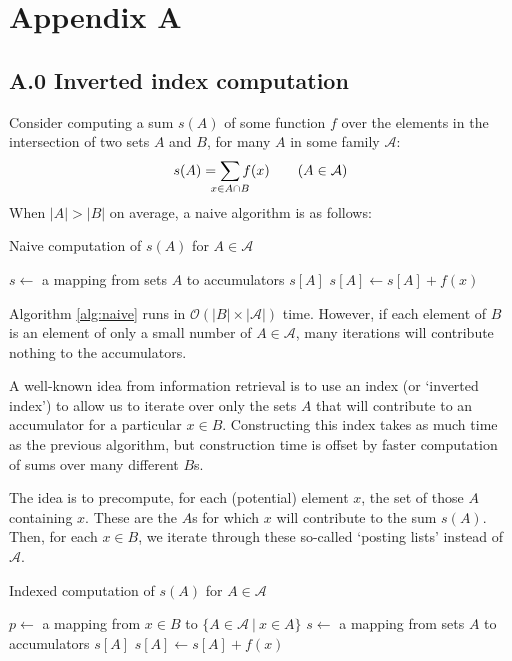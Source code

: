 \documentclass[twocolumn,10pt]{article}
\begin{document}
\section{Appendix A}

\subsection*{A.0 Inverted index computation}

Consider computing a sum $s(A)$ of some function $f$ over the elements
in the intersection of two sets $A$ and $B$, for many $A$ in some
family $\mathcal{A}$:
$$
s(A)
    = \smashoperator{\sum_{x \in A \cap B}} f(x)
\qquad (A \in \mathcal{A})
$$
When $|A| > |B|$ on average, a naive algorithm is as follows:
\begin{algorithm}
\caption{Naive computation of $s(A)$ for $A \in \mathcal{A}$}
\label{alg:naive}
\begin{algorithmic}
    \State $s \gets$ a mapping from sets $A$ to accumulators $s[A]$
                \State $s[A] \gets s[A] + f(x)$
            \EndIf
        \EndFor
    \EndFor
\end{algorithmic}
\end{algorithm}

Algorithm \ref{alg:naive} runs in $\mathcal{O}(|B|\times|\mathcal{A}|)$ time.
However, if each element of $B$ is an element of only a small number
of $A \in\mathcal{A}$, many iterations will contribute nothing to
the accumulators.

A well-known idea from information retrieval is to use an
index (or `inverted index') to allow us to iterate over only
the sets $A$ that will contribute to an accumulator for a particular
$x\in B$. Constructing this index takes as much time as the previous
algorithm, but construction time is offset by faster computation of
sums over many different $B$s.

The idea is to precompute, for each (potential) element $x$, the set
of those $A$ containing $x$. These are the $A$s for which $x$ will
contribute to the sum $s(A)$.
Then, for each $x\in B$, we iterate through these so-called `posting
lists' instead of $\mathcal{A}$.
\begin{algorithm}
\caption{Indexed computation of $s(A)$ for $A \in \mathcal{A}$}
\label{alg:index}
\begin{algorithmic}
    \State $p \gets$ a mapping from $x \in B$ to $\{ A \in \mathcal{A} \ |\  x \in A \}$
    \State $s \gets$ a mapping from sets $A$ to accumulators $s[A]$
            \State $s[A] \gets s[A] + f(x)$
        \EndFor
    \EndFor
\end{algorithmic}
\end{algorithm}
\end{document}
